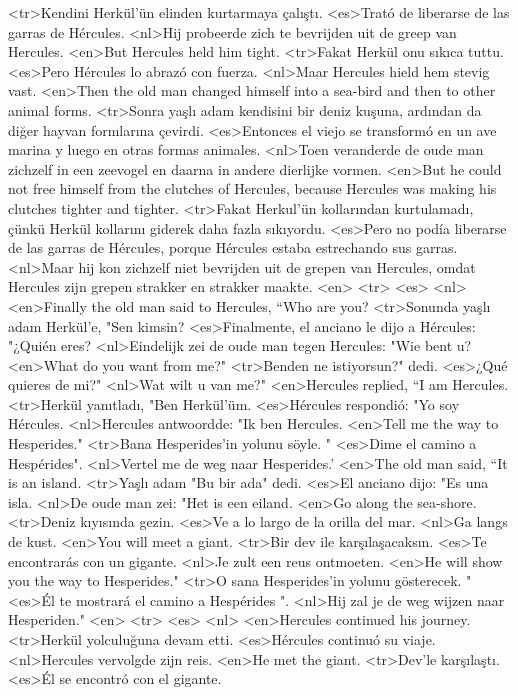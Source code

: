 <tr>Kendini Herkül'ün elinden kurtarmaya çalıştı.
<es>Trató de liberarse de las garras de Hércules.
<nl>Hij probeerde zich te bevrijden uit de greep van Hercules.
<en>But Hercules held him tight.
<tr>Fakat Herkül onu sıkıca tuttu.
<es>Pero Hércules lo abrazó con fuerza.
<nl>Maar Hercules hield hem stevig vast.
<en>Then the old man changed himself into a sea-bird and then to other animal forms.
<tr>Sonra yaşlı adam kendisini bir deniz kuşuna, ardından da diğer hayvan formlarına çevirdi.
<es>Entonces el viejo se transformó en un ave marina y luego en otras formas animales.
<nl>Toen veranderde de oude man zichzelf in een zeevogel en daarna in andere dierlijke vormen.
<en>But he could not free himself from the clutches of Hercules, because Hercules was making his clutches tighter and tighter.
<tr>Fakat Herkul'ün kollarından kurtulamadı, çünkü Herkül kollarını giderek daha fazla sıkıyordu.
<es>Pero no podía liberarse de las garras de Hércules, porque Hércules estaba estrechando sus garras.
<nl>Maar hij kon zichzelf niet bevrijden uit de grepen van Hercules, omdat Hercules zijn grepen strakker en strakker maakte.
<en>
<tr>
<es>
<nl>
<en>Finally the old man said to Hercules, “Who are you?
<tr>Sonunda yaşlı adam Herkül'e, "Sen kimsin?
<es>Finalmente, el anciano le dijo a Hércules: "¿Quién eres?
<nl>Eindelijk zei de oude man tegen Hercules: "Wie bent u?
<en>What do you want from me?"
<tr>Benden ne istiyorsun?" dedi.
<es>¿Qué quieres de mi?"
<nl>Wat wilt u van me?"
<en>Hercules replied, “I am Hercules.
<tr>Herkül yanıtladı, "Ben Herkül'üm.
<es>Hércules respondió: "Yo soy Hércules.
<nl>Hercules antwoordde: "Ik ben Hercules.
<en>Tell me the way to Hesperides."
<tr>Bana Hesperides'in yolunu söyle. "
<es>Dime el camino a Hespérides".
<nl>Vertel me de weg naar Hesperides.'
<en>The old man said, “It is an island.
<tr>Yaşlı adam "Bu bir ada" dedi.
<es>El anciano dijo: "Es una isla.
<nl>De oude man zei: "Het is een eiland.
<en>Go along the sea-shore.
<tr>Deniz kıyısında gezin.
<es>Ve a lo largo de la orilla del mar.
<nl>Ga langs de kust.
<en>You will meet a giant.
<tr>Bir dev ile karşılaşacaksın.
<es>Te encontrarás con un gigante.
<nl>Je zult een reus ontmoeten.
<en>He will show you the way to Hesperides."
<tr>O sana Hesperides'in yolunu gösterecek. "
<es>Él te mostrará el camino a Hespérides ".
<nl>Hij zal je de weg wijzen naar Hesperiden."
<en>
<tr>
<es>
<nl>
<en>Hercules continued his journey.
<tr>Herkül yolculuğuna devam etti.
<es>Hércules continuó su viaje.
<nl>Hercules vervolgde zijn reis.
<en>He met the giant.
<tr>Dev'le karşılaştı.
<es>Él se encontró con el gigante.
